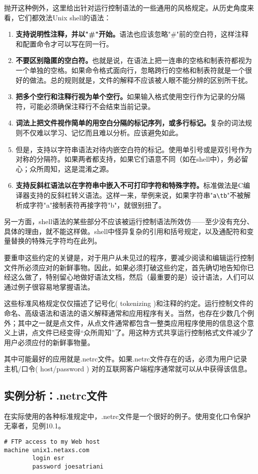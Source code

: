 \documentclass[12pt,oneside]{book}
\begin{document}
\begin{common-format}
抛开这种例外，这里给出针对运行控制语法的一些通用的风格规定。从历史角度来看，它们都效法Unix shell的语法：
\begin{enumerate}
\item \textbf{支持说明性注释，并以"\#{}"开始。}语法也应该忽略"\#{}"前的空白符，这样注释和配置命令才可以写在同一行。
\item \textbf{不要区别隐匿的空白符。}也就是说，在语法上把一连串的空格和制表符都视为一个单独的空格。如果命令格式面向行，忽略跨行的空格和制表符就是一个很好的做法。总的规则就是，文件的解释不应该被人眼不能分辨的区别所干扰。
\item \textbf{把多个空行和注释行视为单个空行。}如果输入格式使用空行作为记录的分隔符，可能必须确保注释行不会结束当前记录。
\item \textbf{词法上把文件视作简单的用空白分隔的标记序列，或多行标记。}复杂的词法规则不仅难以学习、记忆而且难以分析。应该避免如此。
\item 但是，支持以字符串语法对待内嵌空白符的标记。使用单引号或是双引号作为对称的分隔符。如果两者都支持，如果它们语意不同（如在shell中），务必留心；众所周知，这是混淆之源。
\item \textbf{支持反斜杠语法以在字符串中嵌入不可打印字符和特殊字符。}标准做法是C编译器支持的反斜杠转义语法。这样一来，举例来说，如果字符串"\verb+a\tb+"不被解析成字符"a"接制表符再接字符"b"，就很别扭了。
\end{enumerate}

另一方面，shell语法的某些部分不应该被运行控制语法所效仿——至少没有充分、具体的理由，就不能这样做。shell中怪异复杂的引用和括号规定，以及通配符和变量替换的特殊元字符均在此列。

要重申这些约定的关键是，对于用户从未见过的程序，要减少阅读和编辑运行控制文件所必须应对的新鲜事物。因此，如果必须打破这些约定，首先确切地告知你已经这么做了，特别留心地做好语法文档，然后（最重要的是）设计语法，人们可以通过例子很容易地掌握语法。

这些标准风格规定仅仅描述了记号化( tokenizing )和注释的约定。运行控制文件的命名、高级语法和语法的语义解释通常和应用程序有关。当然，也存在少数几个例外；其中之一就是点文件，从点文件通常都包含一整类应用程序使用的信息这个意义上讲，点文件已经变得“众所周知”了。用这种方式共享运行控制格式文件减少了用户必须应付的新鲜事物量。

其中可能最好的应用就是.netrc文件。如果.netrc文件存在的话，必须为用户记录主机/口令( host/password ) 对的互联网客户端程序通常就可以从中获得该信息。


\subsection{实例分析：.netrc文件}
在实际使用的各种标准规定中，.netrc文件是一个很好的例子。使用变化口令保护无辜者，见例10.1。
\begin{Verbatim}[label=例10.1 .netrc例子]
# FTP access to my Web host
machine unix1.netaxs.com
        login esr
        password joesatriani


\end{Verbatim}
\end{common-format}
\end{document}
